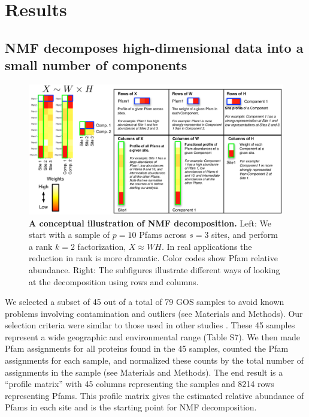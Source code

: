 
\section{Results}

\subsection{NMF decomposes high-dimensional data into a small number of components}

\begin{figure}
\centering
\includegraphics[width=\textwidth]{NMF/figures/fig1}
\caption{\textbf{A conceptual illustration of NMF decomposition.} Left: We start with a sample of $p=10$ Pfams across $s=3$ sites, and perform a rank $k=2$ factorization, $X\approx WH$. In real applications the reduction in rank is more dramatic. Color codes show Pfam relative abundance. Right: The subfigures illustrate different ways of looking at the decomposition using rows and columns.}
\label{facPFAM}
\end{figure}

We selected a subset of 45 out of a total of 79 GOS samples to avoid known problems involving contamination and outliers (see Materials and Methods).  Our selection criteria were similar to those used in other studies \cite{GianRaes09, PateGian10, RaesLetu11}. These 45 samples represent a wide geographic and environmental range (Table S7). We then made Pfam assignments for all proteins found in the 45 samples, counted the Pfam assignments for each sample, and normalized these counts by the total number of assignments in the sample (see Materials and Methods). The end result is a ``profile matrix'' with 45 columns representing the samples and 8214 rows representing Pfams. This profile matrix gives the estimated relative abundance of Pfams in each site and is the starting point for NMF decomposition. 

